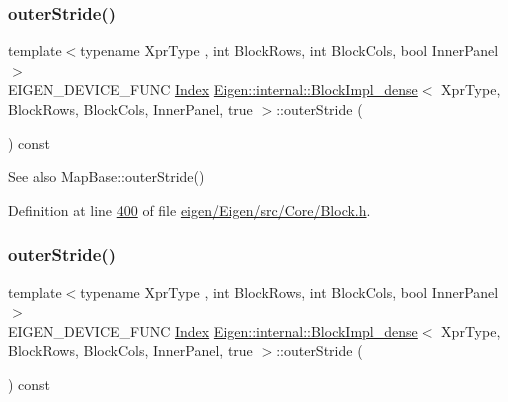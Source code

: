 \subsubsection{\texorpdfstring{outer\+Stride()}{outerStride()}\hspace{0.1cm}{\footnotesize\ttfamily [1/2]}}
{\footnotesize\ttfamily template$<$typename Xpr\+Type , int Block\+Rows, int Block\+Cols, bool Inner\+Panel$>$ \\
E\+I\+G\+E\+N\+\_\+\+D\+E\+V\+I\+C\+E\+\_\+\+F\+U\+NC \hyperlink{namespace_eigen_a62e77e0933482dafde8fe197d9a2cfde}{Index} \hyperlink{class_eigen_1_1internal_1_1_block_impl__dense}{Eigen\+::internal\+::\+Block\+Impl\+\_\+dense}$<$ Xpr\+Type, Block\+Rows, Block\+Cols, Inner\+Panel, true $>$\+::outer\+Stride (\begin{DoxyParamCaption}{ }\end{DoxyParamCaption}) const\hspace{0.3cm}{\ttfamily [inline]}}

\begin{DoxySeeAlso}{See also}
Map\+Base\+::outer\+Stride() 
\end{DoxySeeAlso}


Definition at line \hyperlink{eigen_2_eigen_2src_2_core_2_block_8h_source_l00400}{400} of file \hyperlink{eigen_2_eigen_2src_2_core_2_block_8h_source}{eigen/\+Eigen/src/\+Core/\+Block.\+h}.

\mbox{\label{class_eigen_1_1internal_1_1_block_impl__dense_3_01_xpr_type_00_01_block_rows_00_01_block_cols_00_01_inner_panel_00_01true_01_4_ac6f37b9a06897f0891fcd7b65ce2800e}} 
\subsubsection{\texorpdfstring{outer\+Stride()}{outerStride()}\hspace{0.1cm}{\footnotesize\ttfamily [2/2]}}
{\footnotesize\ttfamily template$<$typename Xpr\+Type , int Block\+Rows, int Block\+Cols, bool Inner\+Panel$>$ \\
E\+I\+G\+E\+N\+\_\+\+D\+E\+V\+I\+C\+E\+\_\+\+F\+U\+NC \hyperlink{namespace_eigen_a62e77e0933482dafde8fe197d9a2cfde}{Index} \hyperlink{class_eigen_1_1internal_1_1_block_impl__dense}{Eigen\+::internal\+::\+Block\+Impl\+\_\+dense}$<$ Xpr\+Type, Block\+Rows, Block\+Cols, Inner\+Panel, true $>$\+::outer\+Stride (\begin{DoxyParamCaption}{ }\end{DoxyParamCaption}) const\hspace{0.3cm}{\ttfamily [inline]}}

